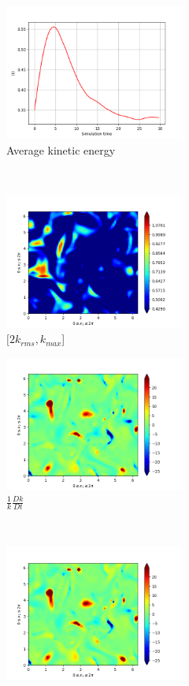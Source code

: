\begin{figure}[H]
    \begin{subfigure}[H]{0.45\textwidth}
        \includegraphics[height=1.75in]{media/run-cds-65/ke-average1330.png}
        \caption{Average kinetic energy}
    \end{subfigure}
    ~
    \begin{subfigure}[H]{0.45\textwidth}
        \includegraphics[height=1.75in]{media/run-cds-65/ke-2-1330.png}
        \caption{$[2k_{rms}, k_{max} $] }
    \end{subfigure}
    \newline
    \begin{subfigure}[H]{0.45\textwidth}
        \includegraphics[height=1.75in]{media/run-cds-65/ke-1330.png}
        \caption{$\frac{1}{k} \frac{D k}{Dt}$}
    \end{subfigure}
    ~
    \begin{subfigure}{0.45\textwidth}
        \includegraphics[height=1.75in]{media/run-cds-65/A-ke-1330.png}

\end{subfigure}
\end{figure}
